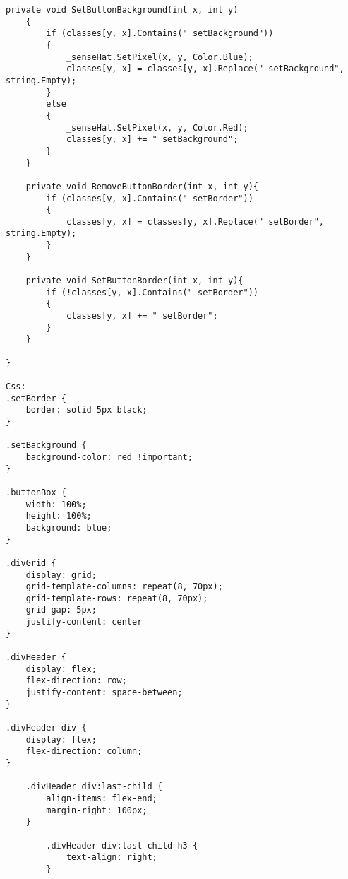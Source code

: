 \begin{lstlisting}[language={[Sharp]C}, caption=Kompletter Demo Code,
	label=lst:DemoCode]
    private void SetButtonBackground(int x, int y)
    {
        if (classes[y, x].Contains(" setBackground"))
        {
            _senseHat.SetPixel(x, y, Color.Blue);
            classes[y, x] = classes[y, x].Replace(" setBackground", string.Empty);
        }
        else
        {
            _senseHat.SetPixel(x, y, Color.Red);
            classes[y, x] += " setBackground";
        }
    }

    private void RemoveButtonBorder(int x, int y){
        if (classes[y, x].Contains(" setBorder"))
        {
            classes[y, x] = classes[y, x].Replace(" setBorder", string.Empty);
        }
    }

    private void SetButtonBorder(int x, int y){
        if (!classes[y, x].Contains(" setBorder"))
        {
            classes[y, x] += " setBorder";
        }
    }

}

Css:
.setBorder {
    border: solid 5px black;
}

.setBackground {
    background-color: red !important;
}

.buttonBox {
    width: 100%;
    height: 100%;
    background: blue;
}

.divGrid {
    display: grid;
    grid-template-columns: repeat(8, 70px);
    grid-template-rows: repeat(8, 70px);
    grid-gap: 5px;
    justify-content: center
}

.divHeader {
    display: flex;
    flex-direction: row;
    justify-content: space-between;
}

.divHeader div {
    display: flex;
    flex-direction: column;
}

    .divHeader div:last-child {
        align-items: flex-end;
        margin-right: 100px;
    }

        .divHeader div:last-child h3 {
            text-align: right;
        }

\end{lstlisting}